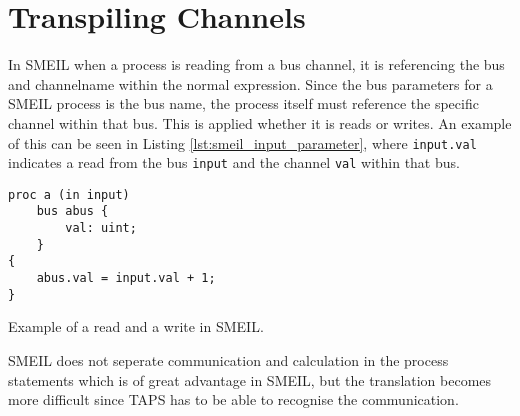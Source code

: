 \section{Transpiling Channels}
In SMEIL when a process is reading from a bus channel, it is referencing the bus and channelname within the normal expression. Since the bus parameters for a SMEIL process is the bus name, the process itself must reference the specific channel within that bus. This is applied whether it is reads or writes.
An example of this can be seen in Listing \ref{lst:smeil_input_parameter}, where \texttt{input.val} indicates a read from the bus \texttt{input} and the channel \texttt{val} within that bus.

\begin{listing}
\begin{verbatim}
proc a (in input)
    bus abus {
        val: uint;
    }
{
    abus.val = input.val + 1;
}
\end{verbatim}
\caption{Example of a read and a write in SMEIL.}
\label{lst:smeil_input_parameter}
\end{listing}
SMEIL does not seperate communication and calculation in the process statements which is of great advantage in SMEIL, but the translation becomes more difficult since TAPS has to be able to recognise the communication.


